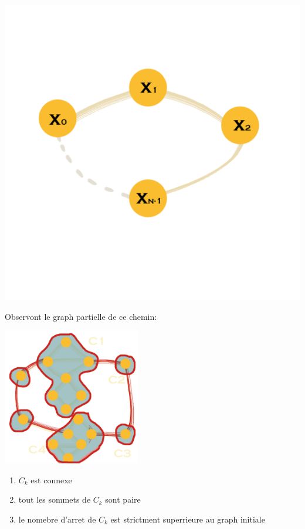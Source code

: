 \documentclass[a4paper,11pt]{article}
\begin{document}
  \begin{minipage}{0.3\textwidth}
  \includegraphics[width=\linewidth]{graphM4.png}
  \end{minipage}
  Observont le graph partielle de ce chemin:
  \begin{center}
  \includegraphics[width=6cm]{connex2.png}
  \begin{enumerate}
    \item $C_k$ est connexe
    \item tout les sommets de $C_k$ sont paire
    \item le nomebre d'arret de $C_k$ est strictment superrieure au graph initiale
  \end{enumerate}
  \end{center}
\end{document}
